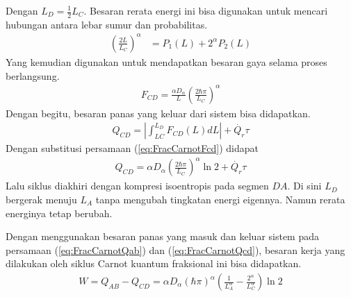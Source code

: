 Dengan \(L_D = \frac{1}{2}L_C\). Besaran rerata energi ini bisa digunakan untuk mencari hubungan antara lebar sumur dan probabilitas.
\begin{align}
    \left(\frac{2L}{L_C}\right)^\alpha &= P_1(L) + 2^\alpha P_2(L)
\end{align}
Yang kemudian digunakan untuk mendapatkan besaran gaya selama proses berlangsung.
\begin{align}
    F_{CD} = \frac{\alpha D_\alpha}{L}\left(\frac{2\hbar\pi}{L_C}\right)^\alpha \label{eq:FracCarnotFcd}
\end{align}
Dengan begitu, besaran panas yang keluar dari sistem bisa didapatkan. 
\begin{align}
    Q_{CD} = \left|\int_{LC}^{L_D}F_{CD}(L)dL\right| + \dot{Q_r}\tau 
\end{align}
Dengan substitusi persamaan (\ref{eq:FracCarnotFcd}) didapat
\begin{align}
    Q_{CD} = \alpha D_\alpha \left(\frac{2\hbar\pi}{L_C}\right)^\alpha \ln{2} + \dot{Q_r}\tau \label{eq:FracCarnotQcd}
\end{align}
Lalu siklus diakhiri dengan kompresi isoentropis pada segmen \(DA\). Di sini \(L_D\) bergerak menuju \(L_A\) tanpa mengubah tingkatan energi eigennya. Namun rerata energinya tetap berubah.
\par Dengan menggunakan besaran panas yang masuk dan keluar sistem pada persamaan (\ref{eq:FracCarnotQab}) dan (\ref{eq:FracCarnotQcd}), besaran kerja yang dilakukan oleh siklus Carnot kuantum fraksional ini bisa didapatkan.
\begin{align}
    W = Q_{AB} - Q_{CD} = \alpha D_\alpha(\hbar\pi)^\alpha \left(\frac{1}{L_A^\alpha} - \frac{2^\alpha}{L_C^\alpha}\right) \ln{2} \label{eq:FracCarnotW}
\end{align}
